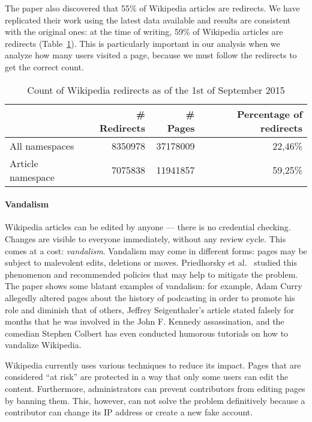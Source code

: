 The paper also discovered that 55\% of Wikipedia articles are redirects.
We have replicated their work using the latest data available and results are consistent with the original ones: at the time of writing, 59\% of Wikipedia articles are redirects (Table~\ref{tbl:redirects}).
This is particularly important in our analysis when we analyze how many users visited a page, because we must follow the redirects to get the correct count.

\begin{table}[t]
\centering
\begin{tabular}{@{}lrrr@{}}
\toprule
\multicolumn{1}{c}{\textbf{}} & \textbf{\# Redirects} & \textbf{\# Pages} & \textbf{Percentage of redirects} \\
\midrule
All namespaces    & 8350978                                & 37178009                               & 22,46\%             \\
Article namespace & 7075838                                & 11941857                               & 59,25\% \\
\bottomrule
\end{tabular}
\caption{Count of Wikipedia redirects as of the 1st of September 2015}
\label{tbl:redirects}
\end{table}

\paragraph{Vandalism}
Wikipedia articles can be edited by anyone --- there is no credential checking.
Changes are visible to everyone immediately, without any review cycle.
This comes at a cost: \emph{vandalism}.
Vandalism may come in different forms: pages may be subject to malevolent edits, deletions or moves.
Priedhorsky et al.~\cite{Priedhorsky2007} studied this phenomenon and recommended policies that may help to mitigate the problem.
The paper shows some blatant examples of vandalism: for example, Adam Curry allegedly altered pages about the history of podcasting in order to promote his role and diminish that of others, Jeffrey Seigenthaler's article stated falsely for months that he was involved in the John F. Kennedy assassination, and the comedian Stephen Colbert has even conducted humorous tutorials on how to vandalize Wikipedia.

Wikipedia currently uses various techniques to reduce its impact.
Pages that are considered ``at risk'' are protected in a way that only some users can edit the content.
Furthermore, administrators can prevent contributors from editing pages by banning them.
This, however, can not solve the problem definitively because a contributor can change its IP address or create a new fake account.

